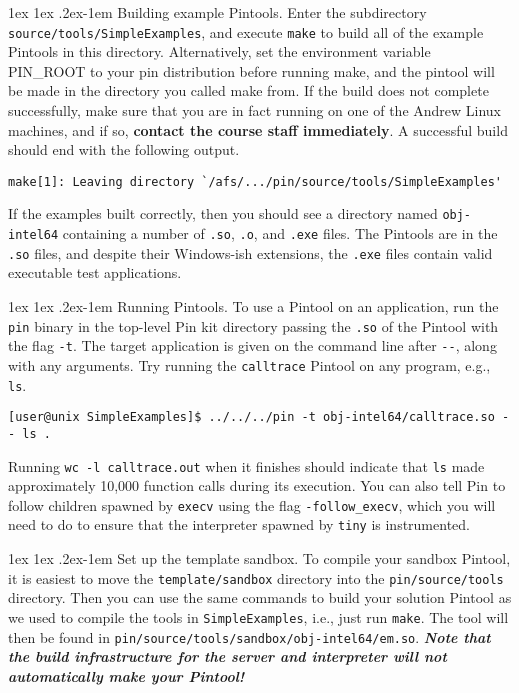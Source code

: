 \documentclass[11pt]{article}
\makeatletter
\renewcommand{\paragraph}{%
  \@startsection{paragraph}{4}%
  {\z@}{1ex \@plus 1ex \@minus .2ex}{-1em}%
  {\normalfont\normalsize\bfseries}
}
\makeatother
\begin{document}
\paragraph{Building example Pintools.}
Enter the subdirectory \verb'source/tools/SimpleExamples', and execute \verb'make' to build all of the example Pintools in this directory. Alternatively, set the environment variable PIN\_ROOT to your pin distribution before running make, and the pintool will be made in the directory you called make from. If the build does not complete successfully, make sure that you are in fact running on one of the Andrew Linux machines, and if so, \textbf{contact the course staff immediately}. A successful build should end with the following output.  
\begin{lstlisting}[basicstyle=\footnotesize\ttfamily,backgroundcolor=\color{gray!15}]
make[1]: Leaving directory `/afs/.../pin/source/tools/SimpleExamples'
\end{lstlisting}
If the examples built correctly, then you should see a directory named \verb'obj-intel64' containing a number of \verb'.so', \verb'.o', and \verb'.exe' files. The Pintools are in the \verb'.so' files, and despite their Windows-ish extensions, the \verb'.exe' files contain valid executable test applications. 

\paragraph{Running Pintools.} To use a Pintool on an application, run the \verb'pin' binary in the top-level Pin kit directory passing the \verb'.so' of the Pintool with the flag \verb'-t'. The target application is given on the command line after \verb'--', along with any arguments. Try running the \verb'calltrace' Pintool on any program, e.g., \verb'ls'.
\begin{lstlisting}[basicstyle=\footnotesize\ttfamily,backgroundcolor=\color{gray!15}]
[user@unix SimpleExamples]$ ../../../pin -t obj-intel64/calltrace.so -- ls .
\end{lstlisting}
Running \verb'wc -l calltrace.out' when it finishes should indicate that \verb'ls' made approximately 10,000 function calls during its execution. You can also tell Pin to follow children spawned by \verb'execv' using the flag \verb'-follow_execv', which you will need to do to ensure that the interpreter spawned by \verb'tiny' is instrumented.

\paragraph{Set up the template sandbox.} To compile your sandbox Pintool, it is easiest to move the \verb'template/sandbox' directory into the \verb'pin/source/tools' directory. Then you can use the same commands to build your solution Pintool as we used to compile the tools in \verb'SimpleExamples', i.e., just run \verb'make'. The tool will then be found in \verb'pin/source/tools/sandbox/obj-intel64/em.so'. \textbf{\emph{Note that the build infrastructure for the server and interpreter will not automatically make your Pintool!}}
\end{document}
